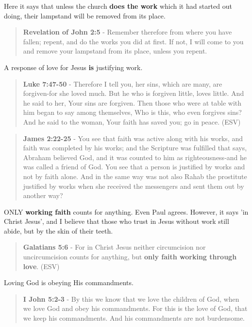 \documentclass[11pt]{article}
\begin{document}
Here it says that unless the church \textbf{does the work} which it had started out doing, their lampstand will be removed from its place.

\begin{quote}
\textbf{Revelation of John 2:5} - Remember therefore from where you have fallen; repent, and do the works you did at first. If not, I will come to you and remove your lampstand from its place, unless you repent.
\end{quote}

A response of love for Jesus \textbf{is} justifying work.

\begin{quote}
\textbf{Luke 7:47-50} - Therefore I tell you, her sins, which are many, are forgiven-for she loved much. But he who is forgiven little, loves little. And he said to her, Your sins are forgiven. Then those who were at table with him began to say among themselves, Who is this, who even forgives sins? And he said to the woman, Your faith has saved you; go in peace. (ESV)
\end{quote}

\begin{quote}
\textbf{James 2:22-25} - You see that faith was active along with his works, and faith was completed by his works; and the Scripture was fulfilled that says, Abraham believed God, and it was counted to him as righteousness-and he was called a friend of God. You see that a person is justified by works and not by faith alone. And in the same way was not also Rahab the prostitute justified by works when she received the messengers and sent them out by another way?
\end{quote}

ONLY \textbf{working faith} counts for anything. Even Paul agrees. However, it says 'in Christ Jesus', and I believe that those who trust in Jesus without work still abide, but by the skin of their teeth.

\begin{quote}
\textbf{Galatians 5:6} - For in Christ Jesus neither circumcision nor uncircumcision counts for anything, but \textbf{only faith working through love}. (ESV)
\end{quote}

Loving God is obeying His commandments.

\begin{quote}
\textbf{I John 5:2-3} - By this we know that we love the children of God, when we love God and obey his commandments. For this is the love of God, that we keep his commandments. And his commandments are not burdensome.
\end{quote}
\end{document}

